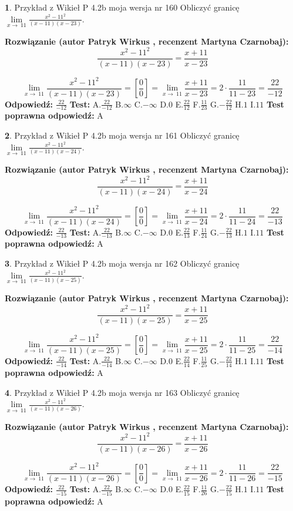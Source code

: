 \documentclass[12pt, a4paper]{article}
\theoremstyle{definition} %
\newtheorem{zad}{}
\newcommand{\zadStart}[1]{\begin{zad}#1\newline}
\newcommand{\zadStop}{\end{zad}}
\newcommand{\rozwStart}[2]{\noindent \textbf{Rozwiązanie (autor #1 , recenzent #2): }\newline}
\newcommand{\rozwStop}{\newline}
\newcommand{\odpStart}{\noindent \textbf{Odpowiedź:}\newline}
\newcommand{\odpStop}{\newline}
\newcommand{\testStart}{\noindent \textbf{Test:}\newline}
\newcommand{\testStop}{\newline}
\newcommand{\kluczStart}{\noindent \textbf{Test poprawna odpowiedź:}\newline}
\newcommand{\kluczStop}{\newline}
\begin{document}
\zadStart{Przykład z Wikieł P 4.2b moja wersja nr 160}
Obliczyć granicę $\lim\limits_{x\to\ 11}\frac{x^{2}-11^{2}}{(x-11)(x-23)}$.
\zadStop
\rozwStart{Patryk Wirkus}{Martyna Czarnobaj}
$$\frac{x^{2}-11^{2}}{(x-11)(x-23)}=\frac{x+11}{x-23}$$

$$\lim\limits_{x\to\ 11}\frac{x^{2}-11^{2}}{(x-11)(x-23)}=[\frac{0}{0}]=\lim\limits_{x\to\ 11}\frac{x+11}{x-23}=2 \cdot \frac{11}{11-23} = \frac{22}{-12}$$
\rozwStop
\odpStart
$\frac{22}{-12}$
\odpStop
\testStart
A.$\frac{22}{-12}$
B.$\infty$
C.$-\infty$
D.$0$
E.$\frac{22}{12}$
F.$\frac{11}{23}$
G.$-\frac{22}{12}$
H.$1$
I.$11$
\testStop
\kluczStart
A
\kluczStop



\zadStart{Przykład z Wikieł P 4.2b moja wersja nr 161}
Obliczyć granicę $\lim\limits_{x\to\ 11}\frac{x^{2}-11^{2}}{(x-11)(x-24)}$.
\zadStop
\rozwStart{Patryk Wirkus}{Martyna Czarnobaj}
$$\frac{x^{2}-11^{2}}{(x-11)(x-24)}=\frac{x+11}{x-24}$$

$$\lim\limits_{x\to\ 11}\frac{x^{2}-11^{2}}{(x-11)(x-24)}=[\frac{0}{0}]=\lim\limits_{x\to\ 11}\frac{x+11}{x-24}=2 \cdot \frac{11}{11-24} = \frac{22}{-13}$$
\rozwStop
\odpStart
$\frac{22}{-13}$
\odpStop
\testStart
A.$\frac{22}{-13}$
B.$\infty$
C.$-\infty$
D.$0$
E.$\frac{22}{13}$
F.$\frac{11}{24}$
G.$-\frac{22}{13}$
H.$1$
I.$11$
\testStop
\kluczStart
A
\kluczStop



\zadStart{Przykład z Wikieł P 4.2b moja wersja nr 162}
Obliczyć granicę $\lim\limits_{x\to\ 11}\frac{x^{2}-11^{2}}{(x-11)(x-25)}$.
\zadStop
\rozwStart{Patryk Wirkus}{Martyna Czarnobaj}
$$\frac{x^{2}-11^{2}}{(x-11)(x-25)}=\frac{x+11}{x-25}$$

$$\lim\limits_{x\to\ 11}\frac{x^{2}-11^{2}}{(x-11)(x-25)}=[\frac{0}{0}]=\lim\limits_{x\to\ 11}\frac{x+11}{x-25}=2 \cdot \frac{11}{11-25} = \frac{22}{-14}$$
\rozwStop
\odpStart
$\frac{22}{-14}$
\odpStop
\testStart
A.$\frac{22}{-14}$
B.$\infty$
C.$-\infty$
D.$0$
E.$\frac{22}{14}$
F.$\frac{11}{25}$
G.$-\frac{22}{14}$
H.$1$
I.$11$
\testStop
\kluczStart
A
\kluczStop



\zadStart{Przykład z Wikieł P 4.2b moja wersja nr 163}
Obliczyć granicę $\lim\limits_{x\to\ 11}\frac{x^{2}-11^{2}}{(x-11)(x-26)}$.
\zadStop
\rozwStart{Patryk Wirkus}{Martyna Czarnobaj}
$$\frac{x^{2}-11^{2}}{(x-11)(x-26)}=\frac{x+11}{x-26}$$

$$\lim\limits_{x\to\ 11}\frac{x^{2}-11^{2}}{(x-11)(x-26)}=[\frac{0}{0}]=\lim\limits_{x\to\ 11}\frac{x+11}{x-26}=2 \cdot \frac{11}{11-26} = \frac{22}{-15}$$
\rozwStop
\odpStart
$\frac{22}{-15}$
\odpStop
\testStart
A.$\frac{22}{-15}$
B.$\infty$
C.$-\infty$
D.$0$
E.$\frac{22}{15}$
F.$\frac{11}{26}$
G.$-\frac{22}{15}$
H.$1$
I.$11$
\testStop
\kluczStart
A
\kluczStop
\end{document}
